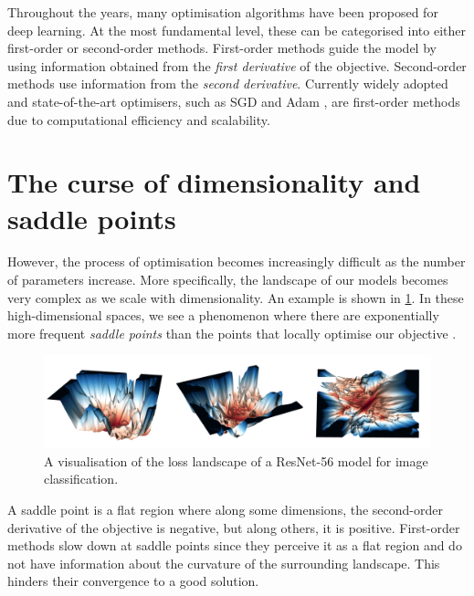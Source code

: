 Throughout the years, many optimisation algorithms have been proposed for deep learning. At the most fundamental level, these can be categorised into either first-order or second-order methods. First-order methods guide the model by using information obtained from the \textit{first derivative} of the objective. Second-order methods use information from the \textit{second derivative}. Currently widely adopted and state-of-the-art optimisers, such as SGD \citep{robbins1951stochastic} and Adam \citep{kingma2014adam}, are first-order methods due to computational efficiency and scalability. 

\section{The curse of dimensionality and saddle points}
\label{sec:curse_of_dimensionality}

However, the process of optimisation becomes increasingly difficult as the number of parameters increase. More specifically, the landscape of our models becomes very complex as we scale with dimensionality. An example is shown in \cref{fig:high_dim_resnet}. In these high-dimensional spaces, we see a phenomenon where there are exponentially more frequent \textit{saddle points} than the points that locally optimise our objective \citep{dauphin2014sfn}. 

\begin{figure}[h]
  \centering
    \includegraphics[width=\textwidth]{figures/0intro/intro_landscape.png}
    \caption{A visualisation of the loss landscape of a ResNet-56 model for image classification.}
    \label{fig:high_dim_resnet}
\end{figure}

A saddle point is a flat region where along some dimensions, the second-order derivative of the objective is negative, but along others, it is positive. First-order methods slow down at saddle points since they perceive it as a flat region and do not have information about the curvature of the surrounding landscape. This hinders their convergence to a good solution. 

